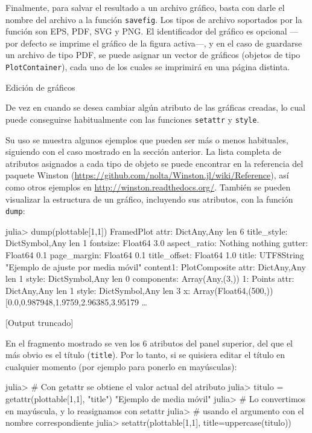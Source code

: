 ﻿\documentclass{article}
\newcommand{\jl}{\texttt}
\begin{document}
Finalmente, para salvar el resultado a un archivo gráfico, basta con darle el nombre del archivo a la función \jl{savefig}. Los tipos de archivo soportados por la función son EPS, PDF, SVG y PNG. El identificador del gráfico es opcional ---por defecto se imprime el gráfico de la figura activa---, y en el caso de guardarse un archivo de tipo PDF, se puede asignar un vector de gráficos (objetos de tipo \jl{PlotContainer}), cada uno de los cuales se imprimirá en una página distinta.


Edición de gráficos

De vez en cuando se desea cambiar algún atributo de las gráficas creadas, lo cual puede conseguirse habitualmente con las funciones \jl{setattr} y \jl{style}.

Su uso se muestra algunos ejemplos que pueden ser más o menos habituales, siguiendo con el caso mostrado en la sección anterior. La lista completa de atributos asignados a cada tipo de objeto se puede encontrar en la referencia del paquete Winston (\url{https://github.com/nolta/Winston.jl/wiki/Reference}), así como otros ejemplos en \url{http://winston.readthedocs.org/}. También se pueden visualizar la estructura de un gráfico, incluyendo sus atributos, con la función \jl{dump}:
 
julia> dump(plottable[1,1])
FramedPlot 
  attr: Dict{Any,Any} len 6
    title_style: Dict{Symbol,Any} len 1
      fontsize: Float64 3.0
    aspect_ratio: Nothing nothing
    gutter: Float64 0.1
    page_margin: Float64 0.1
    title_offset: Float64 1.0
    title: UTF8String "Ejemplo de ajuste por media móvil"
  content1: PlotComposite 
    attr: Dict{Any,Any} len 1
      style: Dict{Symbol,Any} len 0
    components: Array(Any,(3,))
      1: Points 
        attr: Dict{Any,Any} len 1
          style: Dict{Symbol,Any} len 3
        x: Array(Float64,(500,)) [0.0,0.987948,1.9759,2.96385,3.95179 …  

[Output truncado]

En el fragmento mostrado se ven los 6 atributos del panel superior, del que el más obvio es el título (\jl{title}). Por lo tanto, si se quisiera editar el título en cualquier momento (por ejemplo para ponerlo en mayúsculas):

julia> # Con getattr se obtiene el valor actual del atributo
julia> titulo = getattr(plottable[1,1], "title")
"Ejemplo de media móvil"
julia> # Lo convertimos en mayúscula, y lo reasignamos con setattr
julia> # usando el argumento con el nombre correspondiente
julia> setattr(plottable[1,1], title=uppercase(titulo))
\end{document}
